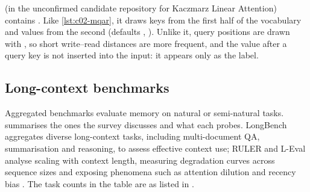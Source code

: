 \begin{implnote}[title={In the code: an MQAR generator in the mirrored repositories}]
 (in the unconfirmed candidate
repository for Kaczmarz Linear Attention) contains . Like
\cref{lst:c02-mqar}, it draws keys from the first half of the vocabulary and values from the second
(defaults , ). Unlike it, query positions are drawn with
, so short write--read distances are more frequent, and the value after a
query key is not inserted into the input: it appears only as the label.
\end{implnote}

\subsection{Long-context benchmarks}\label{sec:c02-benchmarks}

Aggregated benchmarks evaluate memory on natural or semi-natural tasks. 
summarises the ones the survey discusses and what each probes. LongBench aggregates diverse
long-context tasks, including multi-document QA, summarisation and reasoning, to assess effective
context use; RULER and L-Eval analyse scaling with context length, measuring degradation curves
across sequence sizes and exposing phenomena such as attention dilution and recency bias
\citep[\S V-C]{zhoubian2026memory}. The task counts in the table are as listed in
.

